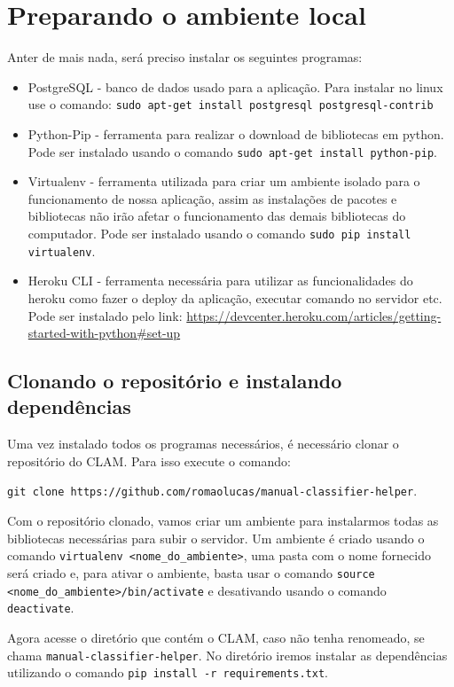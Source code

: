 \section{Preparando o ambiente local}

Anter de mais nada, será preciso instalar os seguintes programas:

\begin{itemize}
	\item PostgreSQL - banco de dados usado para a aplicação. Para instalar no linux
	use o comando: \texttt{sudo apt-get install postgresql postgresql-contrib}
	\item Python-Pip - ferramenta para realizar o download de bibliotecas em python.
	Pode ser instalado usando o comando \texttt{sudo apt-get install python-pip}.
	\item Virtualenv - ferramenta utilizada para criar um ambiente isolado para
	o funcionamento de nossa aplicação, assim as instalações de pacotes e bibliotecas
	não irão afetar o funcionamento das demais bibliotecas do computador. Pode ser
	instalado usando o comando \texttt{sudo pip install virtualenv}.
	\item Heroku CLI - ferramenta necessária para utilizar as funcionalidades do heroku
	como fazer o deploy da aplicação, executar comando no servidor etc. Pode ser instalado
	pelo link: \url{https://devcenter.heroku.com/articles/getting-started-with-python\#set-up}
\end{itemize}

\subsection{Clonando o repositório e instalando dependências}

Uma vez instalado todos os programas necessários, é necessário clonar o repositório do CLAM.
Para isso execute o comando: 

\texttt{git clone https://github.com/romaolucas/manual-classifier-helper}.

Com o repositório clonado, vamos criar um ambiente para instalarmos todas as bibliotecas necessárias
para subir o servidor. Um ambiente é criado usando o comando \texttt{virtualenv <nome_do_ambiente>}, 
uma pasta com o nome fornecido será criado e, para ativar o ambiente, basta usar o comando 
\texttt{source <nome_do_ambiente>/bin/activate} e desativando usando o comando \texttt{deactivate}.

Agora acesse o diretório que contém o CLAM, caso não tenha renomeado, se chama \texttt{manual-classifier-helper}.
No diretório iremos instalar as dependências utilizando o comando \texttt{pip install -r requirements.txt}.

